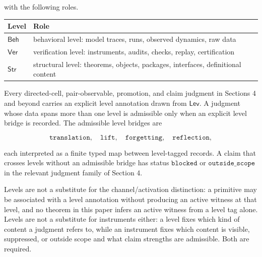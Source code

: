 \documentclass[11pt]{article}
\theoremstyle{definition}
\begin{document}
with the following roles.

\begin{longtable}[]{@{}ll@{}}
\toprule
\begin{minipage}[b]{0.47\columnwidth}\raggedright
Level\strut
\end{minipage} & \begin{minipage}[b]{0.47\columnwidth}\raggedright
Role\strut
\end{minipage}\tabularnewline
\midrule
\endhead
\begin{minipage}[t]{0.47\columnwidth}\raggedright
\(\mathsf{Beh}\)\strut
\end{minipage} & \begin{minipage}[t]{0.47\columnwidth}\raggedright
behavioral level: model traces, runs, observed dynamics, raw data\strut
\end{minipage}\tabularnewline
\begin{minipage}[t]{0.47\columnwidth}\raggedright
\(\mathsf{Ver}\)\strut
\end{minipage} & \begin{minipage}[t]{0.47\columnwidth}\raggedright
verification level: instruments, audits, checks, replay, certification\strut
\end{minipage}\tabularnewline
\begin{minipage}[t]{0.47\columnwidth}\raggedright
\(\mathsf{Str}\)\strut
\end{minipage} & \begin{minipage}[t]{0.47\columnwidth}\raggedright
structural level: theorems, objects, packages, interfaces, definitional content\strut
\end{minipage}\tabularnewline
\bottomrule
\end{longtable}

Every directed-cell, pair-observable, promotion, and claim judgment in Sections 4 and beyond carries an explicit level annotation drawn from \(\mathsf{Lev}\). A judgment whose data spans more than one level is admissible only when an explicit level bridge is recorded. The admissible level bridges are

\[
\texttt{translation},\quad\texttt{lift},\quad\texttt{forgetting},\quad\texttt{reflection},
\]

each interpreted as a finite typed map between level-tagged records. A claim that crosses levels without an admissible bridge has status \(\texttt{blocked}\) or \(\texttt{outside\_scope}\) in the relevant judgment family of Section 4.

Levels are not a substitute for the channel/activation distinction: a primitive may be associated with a level annotation without producing an active witness at that level, and no theorem in this paper infers an active witness from a level tag alone. Levels are not a substitute for instruments either: a level fixes which kind of content a judgment refers to, while an instrument fixes which content is visible, suppressed, or outside scope and what claim strengths are admissible. Both are required.
\end{document}
